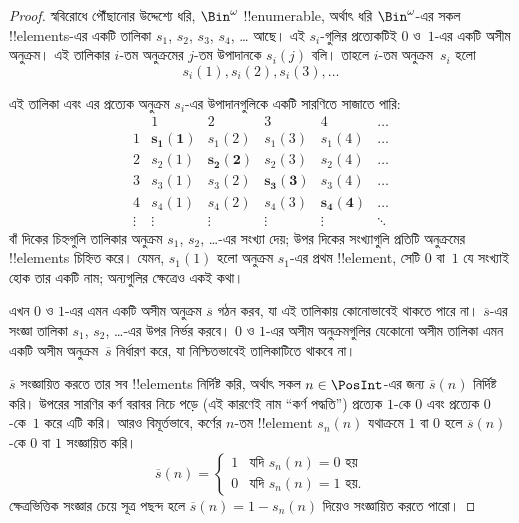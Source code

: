 \documentclass[../../../include/open-logic-section]{subfiles}
\begin{document}
\begin{proof}
স্ববিরোধে পৌঁছানোর উদ্দেশ্যে ধরি, $\Bin^\omega$ !!{enumerable}, অর্থাৎ ধরি $\Bin^\omega$-এর সকল !!{element}s-এর একটি তালিকা $s_{1}$, $s_{2}$, $s_{3}$, $s_{4}$, \dots{} আছে। এই $s_i$-গুলির প্রত্যেকটিই $0$ ও~$1$-এর একটি অসীম অনুক্রম। এই তালিকার $i$-তম অনুক্রমের $j$-তম উপাদানকে $s_i(j)$ বলি। তাহলে $i$-তম অনুক্রম~$s_i$ হলো
\[
s_i(1), s_i(2), s_i(3), \dots
\]

এই তালিকা এবং এর প্রত্যেক অনুক্রম $s_i$-এর উপাদানগুলিকে একটি সারণিতে সাজাতে পারি:
\[
\begin{array}{c|c|c|c|c|c}
& 1 & 2 & 3 & 4 & \dots \\\hline
1 & \mathbf{s_{1}(1)} & s_{1}(2) & s_{1}(3) & s_1(4) & \dots \\\hline
2 & s_{2}(1)& \mathbf{s_{2}(2)} & s_2(3) & s_2(4) & \dots \\\hline
3 & s_{3}(1)& s_{3}(2) & \mathbf{s_3(3)} & s_3(4) & \dots \\\hline
4 & s_{4}(1)& s_{4}(2) & s_4(3) & \mathbf{s_4(4)} & \dots \\\hline
\vdots & \vdots & \vdots & \vdots & \vdots & \mathbf{\ddots}
\end{array}
\]
বাঁ দিকের চিহ্নগুলি তালিকার অনুক্রম $s_1$, $s_2$, \dots-এর সংখ্যা দেয়; উপর দিকের সংখ্যাগুলি প্রতিটি অনুক্রমের !!{element}s চিহ্নিত করে। যেমন, $s_{1}(1)$ হলো অনুক্রম $s_{1}$-এর প্রথম !!{element}, সেটি $0$ বা~$1$ যে সংখ্যাই হোক তার একটি নাম; অন্যগুলির ক্ষেত্রেও একই কথা।

এখন $0$ ও $1$-এর এমন একটি অসীম অনুক্রম $\overline{s}$ গঠন করব, যা এই তালিকায় কোনোভাবেই থাকতে পারে না। $\overline{s}$-এর সংজ্ঞা তালিকা $s_1$, $s_2$, \dots-এর উপর নির্ভর করবে। $0$ ও $1$-এর অসীম অনুক্রমগুলির যেকোনো অসীম তালিকা এমন একটি অসীম অনুক্রম~$\overline{s}$ নির্ধারণ করে, যা নিশ্চিতভাবেই তালিকাটিতে থাকবে না।

$\overline{s}$ সংজ্ঞায়িত করতে তার সব !!{element}s নির্দিষ্ট করি, অর্থাৎ সকল $n \in \PosInt$-এর জন্য $\overline{s}(n)$ নির্দিষ্ট করি। উপরের সারণির কর্ণ বরাবর নিচে পড়ে (এই কারণেই নাম ``কর্ণ পদ্ধতি'') প্রত্যেক $1$-কে $0$ এবং প্রত্যেক $0$-কে~$1$ করে এটি করি। আরও বিমূর্তভাবে, কর্ণের $n$-তম !!{element} $s_n(n)$ যথাক্রমে $1$ বা $0$ হলে $\overline{s}(n)$-কে $0$ বা $1$ সংজ্ঞায়িত করি।
\[
\overline{s}(n) =
\begin{cases}
1 & \text{যদি $s_{n}(n) = 0$ হয়}\\
0 & \text{যদি $s_{n}(n) = 1$ হয়}.
\end{cases}
\]
ক্ষেত্রভিত্তিক সংজ্ঞার চেয়ে সূত্র পছন্দ হলে $\overline{s}(n) = 1 - s_n(n)$ দিয়েও সংজ্ঞায়িত করতে পারো।


\end{proof}
\end{document}
